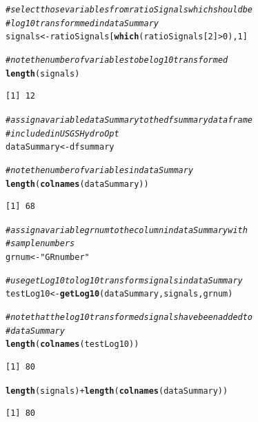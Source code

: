 \documentclass[a4paper,11pt]{article}\usepackage[]{graphicx}\usepackage[]{color}
\makeatletter
\newcommand{\hlnum}[1]{\textcolor[rgb]{0.686,0.059,0.569}{#1}}%
\newcommand{\hlstr}[1]{\textcolor[rgb]{0.192,0.494,0.8}{#1}}%
\newcommand{\hlcom}[1]{\textcolor[rgb]{0.678,0.584,0.686}{\textit{#1}}}%
\newcommand{\hlopt}[1]{\textcolor[rgb]{0,0,0}{#1}}%
\newcommand{\hlstd}[1]{\textcolor[rgb]{0.345,0.345,0.345}{#1}}%
\newcommand{\hlkwb}[1]{\textcolor[rgb]{0.69,0.353,0.396}{#1}}%
\newcommand{\hlkwd}[1]{\textcolor[rgb]{0.737,0.353,0.396}{\textbf{#1}}}%
\newenvironment{kframe}{%
 \def\at@end@of@kframe{}%
 \ifinner\ifhmode%
  \def\at@end@of@kframe{\end{minipage}}%
  \begin{minipage}{\columnwidth}%
 \fi\fi%
 \def\FrameCommand##1{\hskip\@totalleftmargin \hskip-\fboxsep
 \colorbox{shadecolor}{##1}\hskip-\fboxsep
     \hskip-\linewidth \hskip-\@totalleftmargin \hskip\columnwidth}%
 \MakeFramed {\advance\hsize-\width
   \@totalleftmargin\z@ \linewidth\hsize
   \@setminipage}}%
 {\par\unskip\endMakeFramed%
 \at@end@of@kframe}
\newenvironment{knitrout}{}{} %
\makeatother
\begin{document}
\begin{knitrout}
\color{fgcolor}\begin{kframe}
\begin{alltt}
\hlcom{# select those variables from ratioSignals which should be}
\hlcom{# log 10 transformmed in dataSummary}
\hlstd{signals} \hlkwb{<-} \hlstd{ratioSignals[}\hlkwd{which}\hlstd{(ratioSignals[}\hlnum{2}\hlstd{]} \hlopt{>} \hlnum{0}\hlstd{),} \hlnum{1}\hlstd{]}

\hlcom{# note the number of variables to be log 10 transformed}
\hlkwd{length}\hlstd{(signals)}
\end{alltt}
\begin{verbatim}
[1] 12
\end{verbatim}
\begin{alltt}
\hlcom{# assign a variable dataSummary to the dfsummary dataframe}
\hlcom{# included in USGSHydroOpt}
\hlstd{dataSummary} \hlkwb{<-} \hlstd{dfsummary}

\hlcom{# note the number of variables in dataSummary}
\hlkwd{length}\hlstd{(}\hlkwd{colnames}\hlstd{(dataSummary))}
\end{alltt}
\begin{verbatim}
[1] 68
\end{verbatim}
\begin{alltt}
\hlcom{# assign a variable grnum to the column in dataSummary with}
\hlcom{# sample numbers}
\hlstd{grnum} \hlkwb{<-} \hlstr{"GRnumber"}

\hlcom{# use getLog10 to log 10 transform signals in dataSummary}
\hlstd{testLog10} \hlkwb{<-} \hlkwd{getLog10}\hlstd{(dataSummary, signals, grnum)}

\hlcom{# note that the log 10 transformed signals have been added to}
\hlcom{# dataSummary}
\hlkwd{length}\hlstd{(}\hlkwd{colnames}\hlstd{(testLog10))}
\end{alltt}
\begin{verbatim}
[1] 80
\end{verbatim}
\begin{alltt}
\hlkwd{length}\hlstd{(signals)} \hlopt{+} \hlkwd{length}\hlstd{(}\hlkwd{colnames}\hlstd{(dataSummary))}
\end{alltt}
\begin{verbatim}
[1] 80
\end{verbatim}
\end{kframe}
\end{knitrout}

\end{document}
